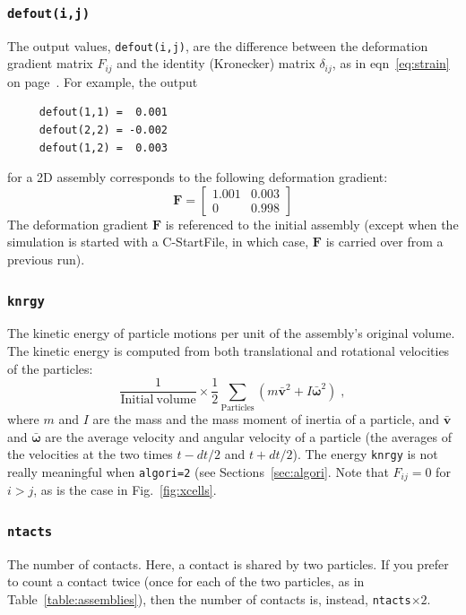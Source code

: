 \documentclass[letterpaper,11pt]{article}
\newcommand{\StartFile}{\textsf{StartFile}}
\begin{document}
\subsubsection{\texttt{defout(i,j)}}\label{sec:defout}
The output values, \texttt{defout(i,j)}, are the difference
between the deformation gradient matrix $F_{ij}$ and the
identity (Kronecker) matrix $\delta_{ij}$, as in eqn~\ref{eq:strain} on
page~\pageref{eq:strain}.
For example, the output
\begin{verbatim}
     defout(1,1) =  0.001
     defout(2,2) = -0.002
     defout(1,2) =  0.003
\end{verbatim}
for a 2D assembly corresponds to the following deformation gradient:
\begin{equation}
\mathbf{F} = \left[
\begin{array}{cc}
1.001 & 0.003\\
0     & 0.998
\end{array}
\right]
\end{equation}
The deformation gradient $\mathbf{F}$ is referenced to the initial
assembly (except when the simulation is started with
a C-\StartFile, in which case, $\mathbf{F}$ is carried over
from a previous run).
%
\subsubsection{\texttt{knrgy}}
The kinetic energy of particle motions per unit of the assembly's 
original volume.  
The kinetic energy is computed from both 
translational and rotational velocities of the particles:
\begin{equation}
\frac{1}{\mathrm{Initial\ volume}}
\times
\frac{1}{2}
\sum_{\text{Particles}} \left(
m \bar{\mathbf{v}}^{2} + I \bar{\boldsymbol{\omega}}^{2}
\right)\;,
\end{equation}
where $m$ and $I$ are the mass and the mass moment of inertia of a particle, 
and $\bar{\mathbf{v}}$ and $\bar{\boldsymbol{\omega}}$ are the
average velocity and angular velocity of a particle 
(the averages of the velocities at the two times
$t-dt/2$ and $t+dt/2$).
The energy \texttt{knrgy} is not really meaningful
when \texttt{algori=2} (see Sections~\ref{sec:algori}.
Note that $F_{ij}=0$ for $i>j$, as is the case
in Fig.~\ref{fig:xcells}.
%
\subsubsection{\texttt{ntacts}}
The number of contacts.  Here, a contact is shared by two particles.  If you
prefer to count a contact twice (once for each of the two particles,
as in Table~\ref{table:assemblies}), then
the number of contacts is, instead, \texttt{ntacts}$\times2$.
%
\end{document}
